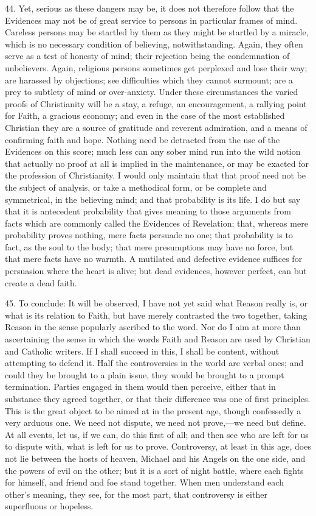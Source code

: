 44. Yet, serious as these dangers may be, it does not therefore
follow that the Evidences may not be of great service to persons in
particular frames of mind. Careless persons may be startled by them as
they might be startled by a miracle, which is no necessary condition
of believing, notwithstanding. Again, they often serve as a test of
honesty of mind; their rejection being the condemnation of
unbelievers. Again, religious persons sometimes get perplexed and lose
their way; are harassed by objections; see difficulties which they
cannot surmount; are a prey to subtlety of mind or over-anxiety. Under
these circumstances the varied proofs of Christianity will be a stay,
a refuge, an encouragement, a rallying point for Faith, a gracious
economy; and even in the case of the most established Christian they
are a source of gratitude and reverent admiration, and a means of
confirming faith and hope. Nothing need be detracted from the use of
the Evidences on this score; much less can any sober mind run into the
wild notion that actually no proof at all is implied in the
maintenance, or may be exacted for the profession of Christianity. I
would only maintain that that proof need not be the subject of
analysis, or take a methodical form, or be complete and symmetrical,
in the believing mind; and that probability is its life. I do but say
that it is antecedent probability that gives meaning to those
arguments from facts which are commonly called the Evidences of
Revelation; that, whereas mere probability proves nothing, mere facts
persuade no one; that probability is to fact, as the soul to the body;
that mere presumptions may have no force, but that mere facts have no
warmth. A mutilated and defective evidence suffices for persuasion
where the heart is alive; but dead evidences, however perfect, can but
create a dead faith.

45. To conclude: It will be observed, I have not yet said what
Reason really is, or what is its relation to Faith, but have merely
contrasted the two together, taking Reason in the sense popularly
ascribed to the word. Nor do I aim at more than ascertaining the sense
in which the words Faith and Reason are used by Christian and Catholic
writers. If I shall succeed in this, I shall be content, without
attempting to defend it. Half the controversies in the world are
verbal ones; and could they be brought to a plain issue, they would be
brought to a prompt termination. Parties engaged in them would then
perceive, either that in substance they agreed together, or that their
difference was one of first principles. This is the great object to be
aimed at in the present age, though confessedly a very arduous one. We
need not dispute, we need not prove,—we need but define. At all
events, let us, if we can, do this first of all; and then see who are
left for us to dispute with, what is left for us to prove.
Controversy, at least in this age, does not lie between the hosts of
heaven, Michael and his Angels on the one side, and the powers of evil
on the other; but it is a sort of night battle, where each fights for
himself, and friend and foe stand together. When men understand each
other's meaning, they see, for the most part, that controversy is
either superfluous or hopeless.

